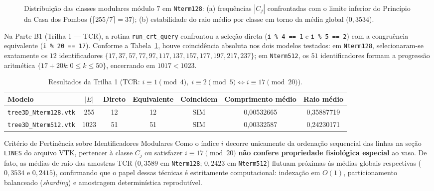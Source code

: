 \documentclass[11pt, a4paper]{article}
\begin{document}
\begin{figure}[htbp]
  \centering
  \resizebox{0.92\linewidth}{!}{}
  \caption{Distribuição das classes modulares módulo $7$ em \texttt{Nterm128}: (a) frequências $|C_j|$ confrontadas com o limite inferior do Princípio da Casa dos Pombos ($\lceil 255/7 \rceil = 37$); (b) estabilidade do raio médio por classe em torno da média global ($0{,}3534$).}
  \label{fig:mod7}
\end{figure}

Na Parte B1 (Trilha 1 --- TCR), a rotina \texttt{run\_crt\_query} confrontou a seleção direta (\texttt{i \% 4 == 1} e \texttt{i \% 5 == 2}) com a congruência equivalente (\texttt{i \% 20 == 17}). Conforme a Tabela~\ref{tab:tcr}, houve coincidência absoluta nos dois modelos testados: em \texttt{Nterm128}, selecionaram-se exatamente os $12$ identificadores $\{17, 37, 57, 77, 97, 117, 137, 157, 177, 197, 217, 237\}$; em \texttt{Nterm512}, os $51$ identificadores formam a progressão aritmética $\{17 + 20k : 0 \le k \le 50\}$, encerrando em $1017 < 1023$.

\begin{table}[htbp]
  \centering
  \footnotesize
  \setlength{\tabcolsep}{5pt}
  \caption{Resultados da Trilha 1 (TCR: $i \equiv 1 \pmod 4,\; i \equiv 2 \pmod 5 \iff i \equiv 17 \pmod{20}$).}
  \label{tab:tcr}
  \begin{tabular}{lcccccc}
    \toprule
    \textbf{Modelo} & \textbf{$|E|$} & \textbf{Direto} & \textbf{Equivalente} & \textbf{Coincidem} & \textbf{Comprimento médio} & \textbf{Raio médio} \\
    \midrule
    \texttt{tree3D\_Nterm128.vtk} & 255  & 12 & 12 & SIM & 0,00532665 & 0,35887719 \\
    \texttt{tree3D\_Nterm512.vtk} & 1023 & 51 & 51 & SIM & 0,00332587 & 0,24230171 \\
    \bottomrule
  \end{tabular}
\end{table}

\begin{nota}{Critério de Pertinência sobre Identificadores Modulares}
Como o índice $i$ decorre unicamente da ordenação sequencial das linhas na seção \texttt{LINES} do arquivo VTK, pertencer à classe $C_j$ ou satisfazer $i \equiv 17 \pmod{20}$ \textbf{não confere propriedade fisiológica especial} ao vaso. De fato, as médias de raio das amostras TCR ($0{,}3589$ em \texttt{Nterm128}; $0{,}2423$ em \texttt{Nterm512}) flutuam próximas às médias globais respectivas ($0{,}3534$ e $0{,}2415$), confirmando que o papel dessas técnicas é estritamente computacional: indexação em $O(1)$, particionamento balanceado (\emph{sharding}) e amostragem determinística reprodutível.
\end{nota}
\end{document}
